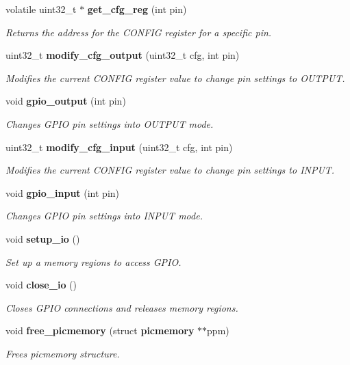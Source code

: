 \begin{DoxyCompactItemize}
volatile uint32\+\_\+t $\ast$ \textbf{ get\+\_\+cfg\+\_\+reg} (int pin)
\begin{DoxyCompactList}\small\item\em Returns the address for the C\+O\+N\+F\+IG register for a specific pin. \end{DoxyCompactList}\item 
uint32\+\_\+t \textbf{ modify\+\_\+cfg\+\_\+output} (uint32\+\_\+t cfg, int pin)
\begin{DoxyCompactList}\small\item\em Modifies the current C\+O\+N\+F\+IG register value to change pin settings to O\+U\+T\+P\+UT. \end{DoxyCompactList}\item 
void \textbf{ gpio\+\_\+output} (int pin)
\begin{DoxyCompactList}\small\item\em Changes G\+P\+IO pin settings into O\+U\+T\+P\+UT mode. \end{DoxyCompactList}\item 
uint32\+\_\+t \textbf{ modify\+\_\+cfg\+\_\+input} (uint32\+\_\+t cfg, int pin)
\begin{DoxyCompactList}\small\item\em Modifies the current C\+O\+N\+F\+IG register value to change pin settings to I\+N\+P\+UT. \end{DoxyCompactList}\item 
void \textbf{ gpio\+\_\+input} (int pin)
\begin{DoxyCompactList}\small\item\em Changes G\+P\+IO pin settings into I\+N\+P\+UT mode. \end{DoxyCompactList}\item 
void \textbf{ setup\+\_\+io} ()
\begin{DoxyCompactList}\small\item\em Set up a memory regions to access G\+P\+IO. \end{DoxyCompactList}\item 
\mbox{\label{rpp_8c_a79fc3c94d1da4bd7016529442e1db11e}} 
void \textbf{ close\+\_\+io} ()
\begin{DoxyCompactList}\small\item\em Closes G\+P\+IO connections and releases memory regions. \end{DoxyCompactList}\item 
void \textbf{ free\+\_\+picmemory} (struct \textbf{ picmemory} $\ast$$\ast$ppm)
\begin{DoxyCompactList}\small\item\em Frees picmemory structure. \end{DoxyCompactList}\item 
$$
\end{DoxyCompactItemize}
